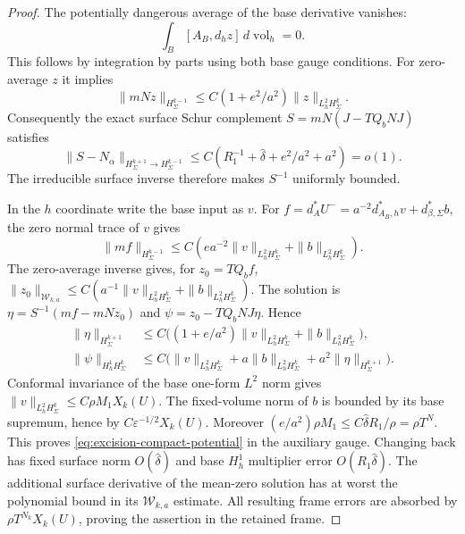 \documentclass[11pt]{amsart}
\theoremstyle{definition}
\theoremstyle{remark}
\theoremstyle{plain}
\begin{document}
\begin{proof}
The potentially dangerous average of the base derivative vanishes:
\begin{equation}\label{eq:excision-base-average-cancellation}
                 \int_B[A_B,d_hz]\,d\operatorname{vol}_h=0.
\end{equation}
This follows by integration by parts using both base gauge
conditions. For zero-average $z$ it implies
\[
 \|mNz\|_{H^{k-1}_\Sigma}
       \leq C(1+e^2/a^2)\|z\|_{L^2_hH^k_\Sigma}.
\]
Consequently the exact surface Schur complement
$S=mN(J-TQ_bNJ)$ satisfies
\begin{equation}\label{eq:excision-compact-surface-schur}
 \|S-N_\alpha\|_{H^{k+1}_\Sigma\to H^{k-1}_\Sigma}
       \leq C(R_1^{-1}+\widehat\delta+e^2/a^2+a^2)=o(1).
\end{equation}
The irreducible surface inverse therefore makes $S^{-1}$
uniformly bounded.

In the $h$ coordinate write the base input as $v$.
For $f=d_A^*U^-=a^{-2}d_{A_B,h}^*v+d_{\beta,\Sigma}^*b$,
the zero normal trace of $v$ gives
\[
 \|mf\|_{H^{k-1}_\Sigma}
       \leq C(ea^{-2}\|v\|_{L^2_hH^k_\Sigma}
                                      +\|b\|_{L^2_hH^k_\Sigma}).
\]
The zero-average inverse gives, for $z_0=TQ_bf$,
$\|z_0\|_{\mathcal W_{k,a}}\leq
C(a^{-1}\|v\|_{L^2_hH^k_\Sigma}+\|b\|_{L^2_hH^k_\Sigma})$.
The solution is
$\eta=S^{-1}(mf-mNz_0)$ and $\psi=z_0-TQ_bNJ\eta$.
Hence
\begin{equation}\label{eq:excision-compact-input-potential}
 \begin{split}
 \|\eta\|_{H^{k+1}_\Sigma}
   &\leq C\bigl((1+e/a^2)\|v\|_{L^2_hH^k_\Sigma}
                                     +\|b\|_{L^2_hH^k_\Sigma}\bigr),\\
 \|\psi\|_{H^1_hH^k_\Sigma}
   &\leq C\bigl(\|v\|_{L^2_hH^k_\Sigma}
          +a\|b\|_{L^2_hH^k_\Sigma}+a^2\|\eta\|_{H^{k+1}_\Sigma}\bigr).
 \end{split}
\end{equation}
Conformal invariance of the base one-form $L^2$ norm gives
$\|v\|_{L^2_hH^k_\Sigma}\leq C\rho M_1X_k(U)$.
The fixed-volume norm of $b$ is bounded by its base supremum,
hence by $C\varepsilon^{-1/2}X_k(U)$.
Moreover
$(e/a^2)\rho M_1\leq C\widehat\delta R_1/\rho=\rho T^N$.
This proves \eqref{eq:excision-compact-potential} in the
auxiliary gauge. Changing back has fixed surface norm
$O(\widehat\delta)$ and base $H^1_h$ multiplier error
$O(R_1\widehat\delta)$.
The additional surface derivative of the mean-zero solution
has at worst the polynomial bound in its $\mathcal W_{k,a}$
estimate. All resulting frame errors are absorbed by
$\rho T^{N_k}X_k(U)$, proving the assertion in the retained frame.
\end{proof}
\end{document}
